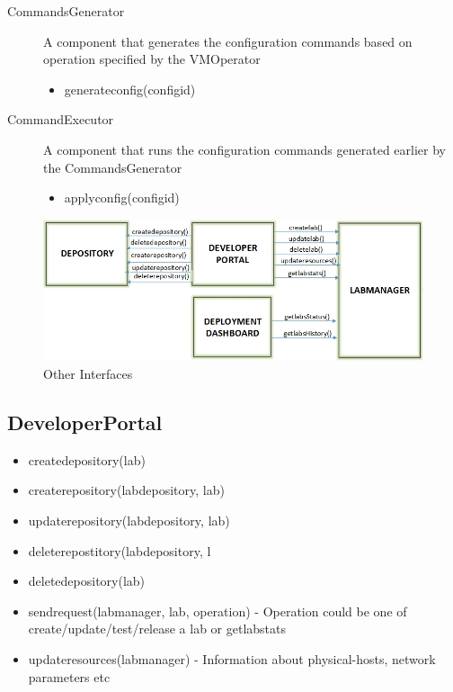 \documentclass[11pt]{article}
\begin{document}
\begin{description}
\item [CommandsGenerator] A component that generates the
         configuration commands based on operation specified by the
         VMOperator

\begin{itemize}
\item generateconfig(configid)
\end{itemize}

\item [CommandExecutor] A component that runs the configuration
         commands generated earlier by the CommandsGenerator

\begin{itemize}
\item applyconfig(configid)
\end{itemize}

\end{description}
    

   \begin{figure}[htb]
\centering
\includegraphics[width=16cm]{Other-Interfaces.jpg}
\caption{Other Interfaces}
\end{figure}   

\subsection{DeveloperPortal}
\label{sec-4.3}


\begin{itemize}
\item createdepository(lab)
\item createrepository(labdepository, lab)
\item updaterepository(labdepository, lab)
\item deleterepostitory(labdepository, l
\item deletedepository(lab)
\item sendrequest(labmanager, lab, operation) - Operation could be one of  create/update/test/release a lab or getlabstats
\item updateresources(labmanager) - Information about physical-hosts, network parameters etc
\end{itemize}
\end{document}
